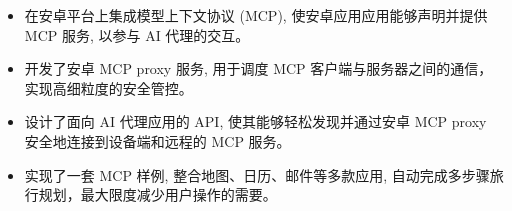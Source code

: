 


\begin{itemize}[nosep]
  \item 在安卓平台上集成模型上下文协议 (MCP), 使安卓应用应用能够声明并提供 MCP 服务, 以参与 AI 代理的交互。
  \item 开发了安卓 MCP proxy 服务, 用于调度 MCP 客户端与服务器之间的通信，实现高细粒度的安全管控。
  \item 设计了面向 AI 代理应用的 API, 使其能够轻松发现并通过安卓 MCP proxy 安全地连接到设备端和远程的 MCP 服务。
  \item 实现了一套 MCP 样例, 整合地图、日历、邮件等多款应用, 自动完成多步骤旅行规划，最大限度减少用户操作的需要。
\end{itemize}
